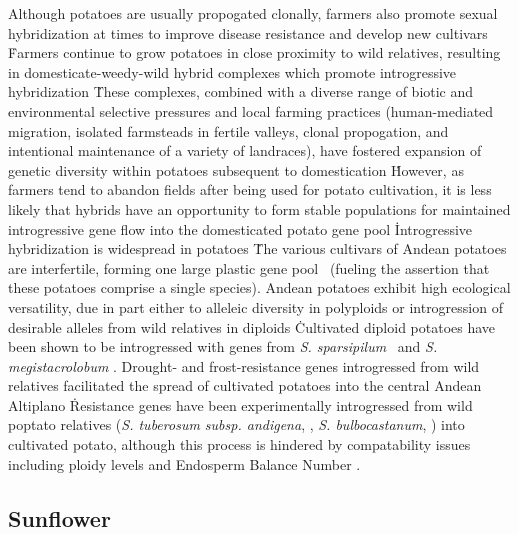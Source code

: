 \documentclass[11pt]{article}
\begin{document}
Although potatoes are usually propogated clonally, farmers also promote sexual hybridization at times to improve disease resistance and develop new cultivars \cite{quiros1992increase}\.
Farmers continue to grow potatoes in close proximity to wild relatives, resulting in domesticate-weedy-wild hybrid complexes which promote introgressive hybridization \cite{rabinowitz1990high, johns1987relationships, linder1987diversity}\.
These complexes, combined with a diverse range of biotic and environmental selective pressures and local farming practices (human-mediated migration, isolated farmsteads in fertile valleys, clonal propogation, and intentional maintenance of a variety of landraces), have fostered expansion of genetic diversity within potatoes subsequent to domestication \cite{brush1995potato}\.
However, as farmers tend to abandon fields after being used for potato cultivation, it is less likely that hybrids have an opportunity to form stable populations for maintained introgressive gene flow into the domesticated potato gene pool \cite{brush1995potato}\.

Introgressive hybridization is widespread in potatoes \cite{grun1990evolution}\.
The various cultivars of Andean potatoes are interfertile, forming one large plastic gene pool \cite{quiros1992increase}\ (fueling the assertion that these potatoes comprise a single species).
Andean potatoes exhibit high ecological versatility, due in part either to alleleic diversity in polyploids or introgression of desirable alleles from wild relatives in diploids \cite{zimmerer1998ecogeography}\.
Cultivated diploid potatoes have been shown to be introgressed with genes from \emph{S. sparsipilum} \cite{rabinowitz1990high}\ and \emph{S. megistacrolobum} \cite{johns1987relationships, huaman1980solanum}.
Drought- and frost-resistance genes introgressed from wild relatives facilitated the spread of cultivated potatoes into the central Andean Altiplano \cite{johns1986ongoing, hawkes1962origin, schmiediche1980breeding}\.
Resistance genes have been experimentally introgressed from wild poptato relatives (\emph{S. tuberosum subsp. andigena}, \cite{van1999tight}, \emph{S. bulbocastanum}, \cite{van2003ancient}) into cultivated potato, although this process is hindered by compatability issues including ploidy levels and Endosperm Balance Number \cite{johnston1980significance}.






\subsection*{Sunflower}
\end{document}
